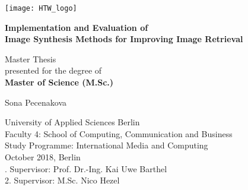 \begin{titlepage}
    \begin{center}
		\texttt{[image: HTW\_logo]}    
		\vspace{1cm}
        
        \Large
        \textbf{Implementation and Evaluation of \\ Image Synthesis Methods for Improving Image Retrieval}
        
        \vspace{0.5cm}
        \Large
        Master Thesis\\
        \vspace{0.5cm}
        \normalsize
        presented for the degree of\\
        \textbf{Master of Science (M.Sc.)}
        
        \vspace{1.5cm}
        
        \Large
        Sona Pecenakova
        
        \end{center}
      
\vspace{1.5cm}

\vfill
\normalsize
\noindent
University of Applied Sciences Berlin\\
Faculty 4: School of Computing, Communication and Business\\
Study Programme: International Media and Computing\\
	
 October 2018, Berlin\\
      
. Supervisor: Prof. Dr.-Ing. Kai Uwe Barthel\\
2. Supervisor: M.Sc. Nico Hezel\\
\end{titlepage}